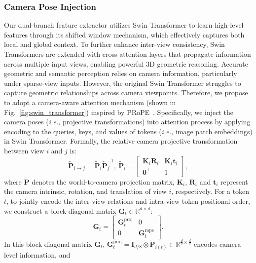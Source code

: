 \documentclass[letterpaper, 10 pt, conference]{ieeeconf}  %
\begin{document}
\subsubsection{Camera Pose Injection}
Our dual-branch feature extractor utilizes Swin Transformer to learn high-level features through its shifted window mechanism, which effectively captures both local and global context. To further enhance inter-view consistency, Swin Transformers are extended with cross-attention layers that propagate information across multiple input views, enabling powerful 3D geometric reasoning.
Accurate geometric and semantic perception relies on camera information, particularly under sparse-view inputs. However, the original Swin Transformer struggles to capture geometric relationships across camera viewpoints.
Therefore, we propose to adopt a camera-aware attention mechanism (shown in Fig.~\ref{fig:swin_transformer}) inspired by PRoPE~\cite{prope}.
Specifically, we inject the camera poses (\textit{i.e.,} projective transformations) into attention process by applying encoding to the queries, keys, and values of tokens (\textit{i.e.,} image patch embeddings) in Swin Transformer.
Formally, the relative camera projective transformation between view $i$ and $j$ is:
\begin{equation}
\tilde{\mathbf{P}}_{i\to j}=\tilde{\mathbf{P}}_{i}\tilde{\mathbf{P}}_{j}^{-1},\ 
\tilde{\mathbf{P}}_{i}=\begin{bmatrix}
\mathbf{K}_i\mathbf{R}_i & \mathbf{K}_i\mathbf{t}_i\\
\mathbf{0}^\top & 1
\end{bmatrix}, 
\end{equation}
where $\tilde{\mathbf{P}}$ denotes the world-to-camera projection matrix, $\mathbf{K}_i$, $\mathbf{R}_i$ and $\mathbf{t}_i$ represent the camera intrinsic, rotation, and translation of view $i$, respectively.
For a token $t$, to jointly encode the inter-view relations and intra-view token positional order, we construct a block-diagonal matrix $\mathbf{G}_{t} \in \mathbb{R}^{d \times d}$:
\begin{equation}
\mathbf{G}_{t}=
\begin{bmatrix}
\mathbf{G}^{\mathrm{proj}}_{t} & 0\\
0 & \mathbf{G}^{\mathrm{rope}}_{t}
\end{bmatrix}.
\end{equation}
In this block-diagonal matrix $\mathbf{G}_{t}$, $\mathbf{G}^{\mathrm{proj}}_{t}=\mathbf{I}_{d/8}\otimes\tilde{\mathbf{P}}_{i(t)} \in \mathbb{R}^{\frac{d}{2} \times \frac{d}{2}}$ encodes camera-level information, and
\end{document}
